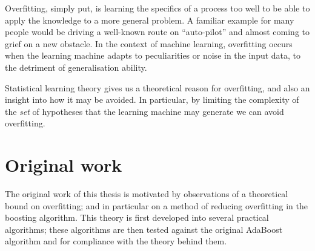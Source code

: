 Overfitting, simply put, is learning the specifics of a process too
well to be able to apply the knowledge to a more general problem.
A familiar example for many people would be driving a well-known route
on ``auto-pilot'' and almost coming to grief on a new obstacle.  In
the context of machine learning, overfitting occurs when the learning
machine adapts to peculiarities or noise in the input data, to the
detriment of generalisation ability.  

Statistical learning theory gives us a theoretical reason for
overfitting, and also an insight into how it may be avoided.  In
particular, by limiting the complexity of the \emph{set} of hypotheses
that the learning machine may generate we can avoid overfitting.


\section{Original work}

The original work of this thesis is motivated by observations of a
theoretical bound on overfitting; and in particular on a method of
reducing overfitting in the boosting algorithm.  This theory is first
developed into several practical algorithms; these algorithms are then
tested against the original AdaBoost algorithm and for compliance with
the theory behind them.





